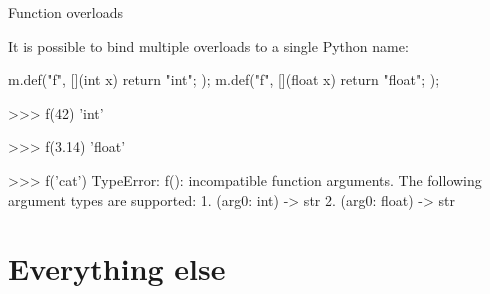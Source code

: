 \documentclass[10pt]{beamer}
\newcommand\cpp[1]{\cpluspluslogo #1}
\begin{document}
\begin{frame}[fragile]{Function overloads}

    It is possible to bind multiple \cpp{} overloads to a single
    Python name:

    \begin{cppcode}
        m.def("f", [](int x) { return "int"; });
        m.def("f", [](float x) { return "float"; });
    \end{cppcode}

    \pause

    \begin{pythoncode}
        >>> f(42)
        'int'

        >>> f(3.14)
        'float'

        >>> f('cat')
        TypeError: f(): incompatible function arguments.
        The following argument types are supported:
            1. (arg0: int) -> str
            2. (arg0: float) -> str
    \end{pythoncode}
\end{frame}


\section{Everything else}

\end{document}

